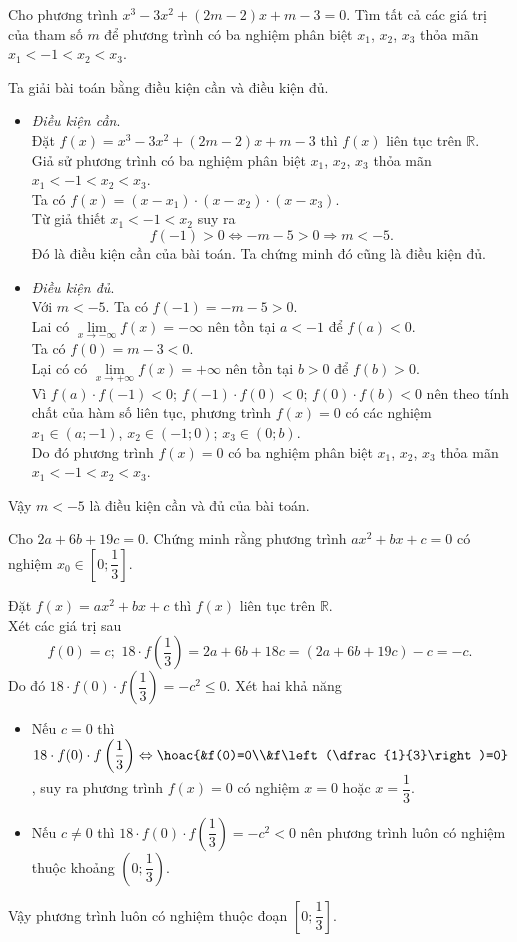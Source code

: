 \begin{bt}%
Cho phương trình $x^3-3x^2+\left(2m-2\right)x+m-3=0$. Tìm tất cả các giá trị của tham số $m$ để phương trình có ba nghiệm phân biệt $x_1$, $x_2$, $x_3$ thỏa mãn $x_1<-1<x_2<x_3$.
\loigiai
{ Ta giải bài toán bằng điều kiện cần và điều kiện đủ.
\begin{itemize}
\item[•] \textit{Điều kiện cần}.\\
Đặt $f(x)=x^3-3x^2+\left(2m-2\right)x+m-3$ thì $f(x)$ liên tục trên $\mathbb{R}$.\\
Giả sử phương trình có ba nghiệm phân biệt $x_1$, $x_2$, $x_3$ thỏa mãn $x_1<-1<x_2<x_3$. \\
Ta có $f(x)=(x-x_1)\cdot (x-x_2)\cdot (x-x_3)$.\\
Từ giả thiết $x_1<-1<x_2$ suy ra 
\[f(-1)>0\Leftrightarrow -m-5>0\Rightarrow m<-5.\]
Đó là điều kiện cần của bài toán. Ta chứng minh đó cũng là điều kiện đủ.
\item[•] \textit{Điều kiện đủ}.\\
Với $m<-5$. Ta có $f(-1)=-m-5>0$.\\
Lai có $\lim \limits _{x\to -\infty}f(x)=-\infty$ nên tồn tại $a<-1$ để $f(a)<0$.\\
Ta có $f(0)=m-3<0$. \\
Lại có có $\lim \limits _{x\to +\infty}f(x)=+\infty$ nên tồn tại $b>0$ để $f(b)>0$.\\
Vì $f(a)\cdot f(-1)<0$; $f(-1)\cdot f(0)<0$; $f(0)\cdot f(b)<0$ nên theo tính chất của hàm số liên tục, phương trình $f(x)=0$ có các nghiệm $x_1\in (a;-1)$, $x_2\in (-1;0)$; $x_3\in (0;b)$.\\
Do đó phương trình $f(x)=0$ có ba nghiệm phân biệt $x_1$, $x_2$, $x_3$ thỏa mãn $x_1<-1<x_2<x_3$.
\end{itemize}
Vậy $m<-5$ là điều kiện cần và đủ của bài toán.
}
\end{bt}
\begin{bt}%
Cho $2a+6b+19c=0$. Chứng minh rằng phương trình $ax^2+bx+c=0$ có nghiệm $ x_0\in \left[0;\dfrac{1}{3}\right]$.
\loigiai
{ Đặt $f(x)=ax^2+bx+c$ thì $f(x)$ liên tục trên $\mathbb{R}$.\\
Xét các giá trị sau $$f(0)=c;\,\,18\cdot f\left(\dfrac{1}{3}\right)=2a+6b+18c=(2a+6b+19c)-c=-c.$$
Do đó $18\cdot f(0)\cdot f\left(\dfrac{1}{3}\right)=-c^2\le 0$. Xét hai khả năng
\begin{itemize}
\item[•] Nếu $c=0$ thì $18\cdot f(0)\cdot f\left(\dfrac{1}{3}\right)\Leftrightarrow \hoac{&f(0)=0\\&f\left(\dfrac{1}{3}\right)=0}$, suy ra phương trình $f(x)=0$ có nghiệm $x=0$ hoặc $x=\dfrac{1}{3}$.
\item[•] Nếu $c\ne 0$ thì $18\cdot f(0)\cdot f\left(\dfrac{1}{3}\right)=-c^2<0$ nên phương trình luôn có nghiệm thuộc khoảng $\left(0;\dfrac{1}{3}\right)$.
\end{itemize} 
Vậy phương trình luôn có nghiệm thuộc đoạn $\left[0;\dfrac{1}{3}\right]$.
}
\end{bt}

